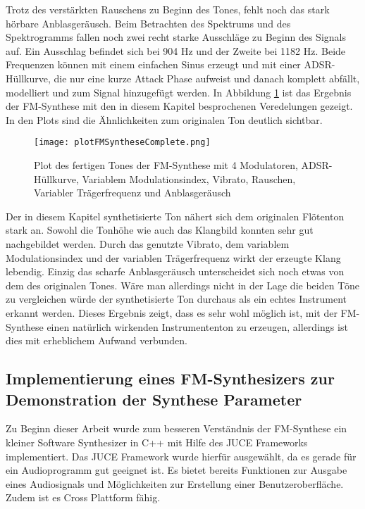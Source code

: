 Trotz des verstärkten Rauschens zu Beginn des Tones, fehlt noch das stark hörbare Anblasgeräusch. Beim Betrachten des Spektrums und des Spektrogramms fallen noch zwei recht starke Ausschläge zu Beginn des Signals auf. Ein Ausschlag befindet sich bei 904 Hz und der Zweite bei 1182 Hz. Beide Frequenzen können mit einem einfachen Sinus erzeugt und mit einer ADSR-Hüllkurve, die nur eine kurze Attack Phase aufweist und danach komplett abfällt, modelliert und zum Signal hinzugefügt werden. In Abbildung \ref{fig:plotFMSyntheseComplete} ist das Ergebnis der FM-Synthese mit den in diesem Kapitel besprochenen Veredelungen gezeigt. In den Plots sind die Ähnlichkeiten zum originalen Ton deutlich sichtbar.

\begin{figure} [h!t!b!]
\centering
  \texttt{[image: plotFMSyntheseComplete.png]}
\caption{Plot des fertigen Tones der FM-Synthese mit 4 Modulatoren, ADSR-Hüllkurve, Variablem Modulationsindex, Vibrato, Rauschen, Variabler Trägerfrequenz und Anblasgeräusch}
\label{fig:plotFMSyntheseComplete}
\end{figure}

Der in diesem Kapitel synthetisierte Ton nähert sich dem originalen Flötenton stark an. Sowohl die Tonhöhe wie auch das Klangbild konnten sehr gut nachgebildet werden. Durch das genutzte Vibrato, dem variablem Modulationsindex und der variablen Trägerfrequenz wirkt der erzeugte Klang lebendig. Einzig das scharfe Anblasgeräusch unterscheidet sich noch etwas von dem des originalen Tones. Wäre man allerdings nicht in der Lage die beiden Töne zu vergleichen würde der synthetisierte Ton durchaus als ein echtes Instrument erkannt werden. Dieses Ergebnis zeigt, dass es sehr wohl möglich ist, mit der FM-Synthese einen natürlich wirkenden Instrumententon zu erzeugen, allerdings ist dies mit erheblichem Aufwand verbunden.


\FloatBarrier
\subsection{Implementierung eines FM-Synthesizers zur Demonstration der Synthese Parameter}

Zu Beginn dieser Arbeit wurde zum besseren Verständnis der FM-Synthese ein kleiner Software Synthesizer in C++ mit Hilfe des JUCE Frameworks implementiert. Das JUCE Framework wurde hierfür ausgewählt, da es gerade für ein Audioprogramm gut geeignet ist. Es bietet bereits Funktionen zur Ausgabe eines Audiosignals und Möglichkeiten zur Erstellung einer Benutzeroberfläche. Zudem ist es Cross Plattform fähig.

